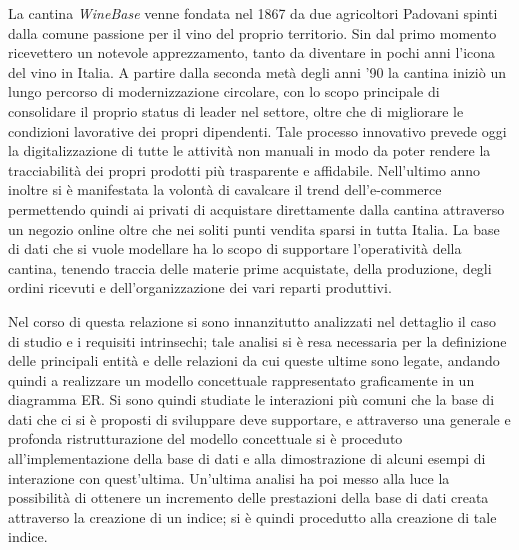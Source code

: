 La cantina \emph{WineBase} venne fondata nel 1867 da due agricoltori Padovani spinti dalla comune passione per il vino del proprio territorio. Sin dal primo momento ricevettero un notevole apprezzamento, tanto da diventare in pochi anni l'icona del vino in Italia. A partire dalla seconda metà degli anni '90 la cantina iniziò un lungo percorso di modernizzazione circolare, con lo scopo principale di consolidare il proprio status di leader nel settore, oltre che di migliorare le condizioni lavorative dei propri dipendenti. Tale processo innovativo prevede oggi la digitalizzazione di tutte le attività non manuali in modo da poter rendere la tracciabilità dei propri prodotti più trasparente e affidabile. Nell'ultimo anno inoltre si è manifestata la volontà di cavalcare il trend dell'e-commerce permettendo quindi ai privati di acquistare direttamente dalla cantina attraverso un negozio online oltre che nei soliti punti vendita sparsi in tutta Italia. La base di dati che si vuole modellare ha lo scopo di supportare l'operatività della cantina, tenendo traccia delle materie prime acquistate, della produzione, degli ordini ricevuti e dell'organizzazione dei vari reparti produttivi. 

Nel corso di questa relazione si sono innanzitutto analizzati nel dettaglio il caso di studio e i requisiti intrinsechi; tale analisi si è resa necessaria per la definizione delle principali entità e delle relazioni da cui queste ultime sono legate, andando quindi a realizzare un modello concettuale rappresentato graficamente in un diagramma ER. Si sono quindi studiate le interazioni più comuni che la base di dati che ci si è proposti di sviluppare deve supportare, e attraverso una generale e profonda ristrutturazione del modello concettuale si è proceduto all'implementazione della base di dati e alla dimostrazione di alcuni esempi di interazione con quest'ultima. Un'ultima analisi ha poi messo alla luce la possibilità di ottenere un incremento delle prestazioni della base di dati creata attraverso la creazione di un indice; si è quindi procedutto alla creazione di tale indice.